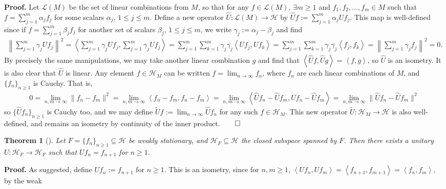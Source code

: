 \documentclass[11pt]{report}
\newcommand{\mc}[1]{\mathcal{#1}}
\newcommand{\ip}[2]{\left\langle#1,#2\right\rangle }
\newcommand{\1}[1]{\mathbbm{1}_{\{#1\}}}
\newtheorem{theorem}{Theorem}[section]
\theoremstyle{definition}
\begin{document}
    \noindent\textbf{Proof.} Let $\mc{L}(M)$ be the set of linear combinations
    from $M$, so that for any $f\in\mc{L}(M)$, $\exists m\geq 1$ and
    $f_1,f_2,\dots,f_m\in M$ such that $f=\sum_{j=1}^m\alpha_j f_j$ for some
    scalars $\alpha_j$, $1\leq j\leq m$. Define a new operator
    $\hat{U}:\mc{L}(M)\rightarrow\mc{H}$ by
    $\hat{U}f:=\sum_{j=1}^m\alpha_jUf_j$. This map is well-defined since if
    $f=\sum_{j=1}^m\beta_jf_j$ for another set of scalars $\beta_j$, $1\leq
    j\leq m$, we write $\gamma_j:=\alpha_j-\beta_j$ and find
    \begin{align*}
        \left\|\sum_{j=1}^m\gamma_jUf_j\right\|^2=\ip{\sum_{j=1}^m\gamma_jUf_j}{\sum_{j=1}^m\gamma_jUf_j}=\sum_{j=1}^m\sum_{k=1}^m\gamma_j\overline{\gamma_j}\ip{Uf_j}{Uf_k}=\sum_{j=1}^m\sum_{k=1}^m\gamma_j\overline{\gamma_j}\ip{f_j}{f_k}=\left\|\sum_{j=1}^m\gamma_jf_j\right\|^2=0.
    \end{align*}
    By precisely the same manipulations, we may take another linear combination
    $g$ and find that $\ip{\hat{U}f}{\hat{U}g}=\ip{f}{g}$, so $\hat{U}$ is an
    isometry. It is also clear that $\hat{U}$ is linear. Any element
    $f\in\mc{H}_M$ can be written $f=\lim_{n\rightarrow\infty}f_n$, where $f_n$
    are each linear combinations of $M$, and $\{f_n\}_{n\geq 1}$ is Cauchy. That
    is,
    \begin{align*}
        0=\lim_{n,m\rightarrow\infty}\|f_n-f_m\|^2=\lim_{n,m\rightarrow\infty}\ip{f_n-f_m}{f_n-f_m}=\lim_{n,m\rightarrow\infty}\ip{\hat{U}f_n-\hat{U}f_m}{\hat{U}f_n-\hat{U}f_m}=\lim_{n,m\rightarrow\infty}\|\hat{U}f_n-\hat{U}f_m\|^2
    \end{align*}
    so $\{\hat{U}f_n\}_{n\geq 1}$ is Cauchy too, and we may define
    $\widetilde{U}f:=\lim_{n\rightarrow\infty}\hat{U}f_n$ for any such
    $f\in\mc{H}_M$. This new operator $\widetilde{U}:\mc{H}_M\rightarrow\mc{H}$
    is also well-defined, and remains an isometry by continuity of the inner
    product.\hfill{$\qed$}
    \begin{theorem}[{\cite[theorem 2.1.3]{Weber_2000}}]\label{thm2} Let
        $F=\{f_n\}_{n\geq 1}\subseteq\mc{H}$ be weakly stationary, and
        $\mc{H}_F\subseteq\mc{H}$ the closed subspace spanned by $F$. Then there
        exists a unitary $U:\mc{H}_F\rightarrow\mc{H}_F$ such that
        $Uf_n=f_{n+1}$ for $n\geq 1$.
    \end{theorem}
    \noindent\textbf{Proof.} As suggested, define $Uf_n:=f_{n+1}$ for $n\geq 1$.
    This is an isometry, since for $n,m\geq 1$,
    $\ip{Uf_n}{Uf_m}=\ip{f_{n+1}}{f_{m+1}}=\ip{f_n}{f_m}$, by the weak
\end{document}

